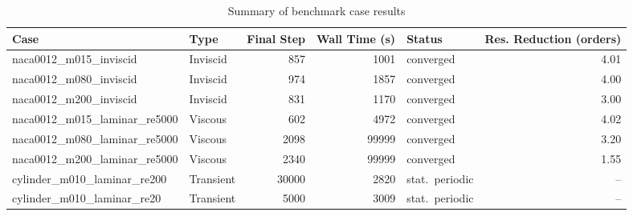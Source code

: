 \begin{table}[h!]
\centering
\caption{Summary of benchmark case results}
\label{tab:summary}
\begin{tabular}{llrrlr}
\toprule
Case & Type & Final Step & Wall Time (s) & Status & Res. Reduction (orders) \\
\midrule
naca0012\_m015\_inviscid & Inviscid & 857 & 1001 & converged & 4.01 \\
naca0012\_m080\_inviscid & Inviscid & 974 & 1857 & converged & 4.00 \\
naca0012\_m200\_inviscid & Inviscid & 831 & 1170 & converged & 3.00 \\
naca0012\_m015\_laminar\_re5000 & Viscous & 602 & 4972 & converged & 4.02 \\
naca0012\_m080\_laminar\_re5000 & Viscous & 2098 & 99999 & converged & 3.20 \\
naca0012\_m200\_laminar\_re5000 & Viscous & 2340 & 99999 & converged & 1.55 \\
cylinder\_m010\_laminar\_re200 & Transient & 30000 & 2820 & stat.~periodic & -- \\
cylinder\_m010\_laminar\_re20 & Transient & 5000 & 3009 & stat.~periodic & -- \\
\bottomrule
\end{tabular}
\end{table}
